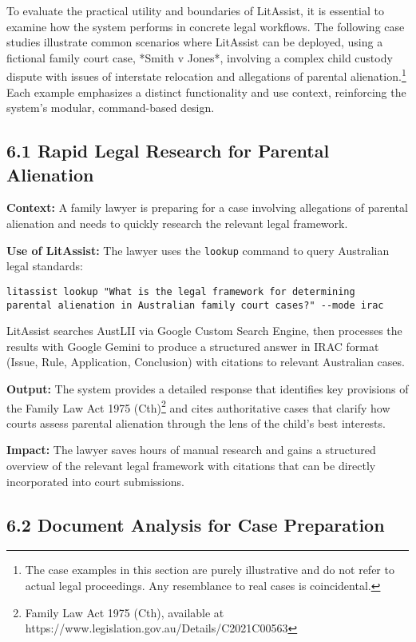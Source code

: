 \documentclass[12pt,a4paper]{article}
\begin{document}
To evaluate the practical utility and boundaries of LitAssist, it is essential to examine how the system performs in concrete legal workflows. The following case studies illustrate common scenarios where LitAssist can be deployed, using a fictional family court case, *Smith v Jones*, involving a complex child custody dispute with issues of interstate relocation and allegations of parental alienation.\footnote{The case examples in this section are purely illustrative and do not refer to actual legal proceedings. Any resemblance to real cases is coincidental.} Each example emphasizes a distinct functionality and use context, reinforcing the system's modular, command-based design.

\subsection*{6.1 Rapid Legal Research for Parental Alienation}

\textbf{Context:} A family lawyer is preparing for a case involving allegations of parental alienation and needs to quickly research the relevant legal framework.

\textbf{Use of LitAssist:} The lawyer uses the \texttt{lookup} command to query Australian legal standards:

\begin{verbatim}
litassist lookup "What is the legal framework for determining 
parental alienation in Australian family court cases?" --mode irac
\end{verbatim}

LitAssist searches AustLII via Google Custom Search Engine, then processes the results with Google Gemini to produce a structured answer in IRAC format (Issue, Rule, Application, Conclusion) with citations to relevant Australian cases.

\textbf{Output:} The system provides a detailed response that identifies key provisions of the Family Law Act 1975 (Cth)\footnote{Family Law Act 1975 (Cth), available at https://www.legislation.gov.au/Details/C2021C00563} and cites authoritative cases that clarify how courts assess parental alienation through the lens of the child's best interests.

\textbf{Impact:} The lawyer saves hours of manual research and gains a structured overview of the relevant legal framework with citations that can be directly incorporated into court submissions.

\subsection*{6.2 Document Analysis for Case Preparation}
\end{document}
